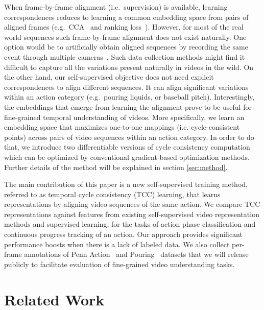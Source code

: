 \documentclass[10pt,twocolumn,letterpaper]{article}
\begin{document}
When frame-by-frame alignment (i.e.\ supervision) is available, learning correspondences reduces to learning a common embedding space from pairs of aligned frames (e.g.\ CCA~\cite{anderson1958introduction,andrew2013deep} and ranking loss~\cite{Sermanet2017TCN}). However, for most of the real world sequences such frame-by-frame alignment does not exist naturally. One option would be to artificially obtain aligned sequences by recording the same event through multiple cameras~\cite{Sermanet2017TCN,sigurdsson2018actor,revaud2013event}. Such data collection methods might find it difficult to capture all the variations present naturally in videos in the wild. On the other hand, our self-supervised objective does not need explicit correspondences to align different sequences. It can align significant variations within an action category (e.g.\ pouring liquids, or baseball pitch). Interestingly, the embeddings that emerge from learning the alignment prove to be useful for fine-grained temporal understanding of videos. More specifically, we learn an embedding space that maximizes one-to-one mappings (i.e. cycle-consistent points) across pairs of video sequences within an action category. In order to do that, we introduce two differentiable versions of cycle consistency computation which can be optimized by conventional gradient-based optimization methods. Further details of the method will be explained in section \ref{sec:method}.

The main contribution of this paper is a new self-supervised training method, referred to as temporal cycle consistency (TCC) learning, that learns representations by aligning video sequences of the same action. We compare TCC representations against features from existing self-supervised video representation methods \cite{Sermanet2017TCN,misra2016shuffle} and supervised learning, for the tasks of action phase classification and continuous progress tracking of an action. Our approach provides significant performance boosts when there is a lack of labeled data. We also collect per-frame annotations of Penn Action~\cite{zhang2013actemes} and Pouring~\cite{Sermanet2017TCN} datasets that we will release publicly to facilitate evaluation of fine-grained video understanding tasks.
 \section{Related Work}
\end{document}
